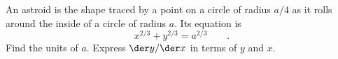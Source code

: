 An astroid is the shape traced by a point on a circle of radius $a/4$ as it rolls
around the inside of a circle of radius $a$. Its equation is
\begin{equation*}
  x^{2/3}+y^{2/3} = a^{2/3} \qquad .
\end{equation*}
Find the units of $a$.
Express $\der y/\der x$ in terms of $y$ and $x$.
